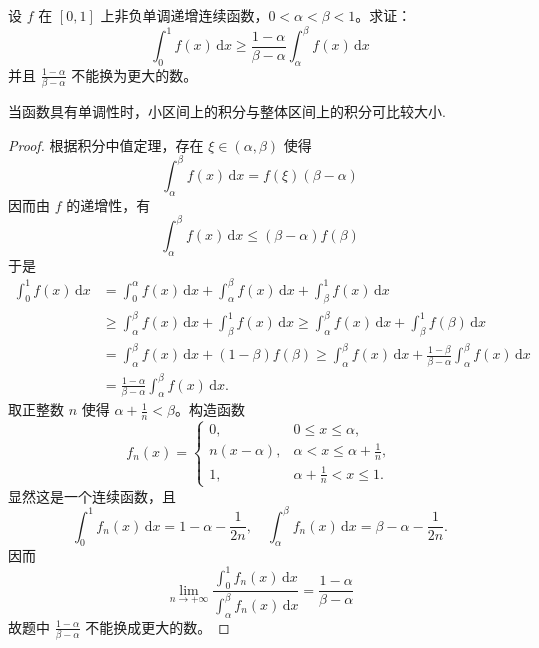 \documentclass[../../main.tex]{subfiles}
\begin{document}
\begin{example}
设 \( f \) 在 \([0,1]\) 上非负单调递增连续函数，\( 0 < \alpha < \beta < 1 \)。求证：
\[
\int_{0}^{1} f(x) \, \mathrm{d}x \geqslant \frac{1 - \alpha}{\beta - \alpha} \int_{\alpha}^{\beta} f(x) \, \mathrm{d}x
\]
并且 \( \frac{1 - \alpha}{\beta - \alpha} \) 不能换为更大的数。
\end{example}
\begin{remark}
当函数具有单调性时，小区间上的积分与整体区间上的积分可比较大小.
\end{remark}
\begin{proof}
根据积分中值定理，存在 \( \xi \in (\alpha, \beta) \) 使得
\[
\int_{\alpha}^{\beta} f(x) \, \mathrm{d}x = f(\xi)(\beta - \alpha)
\]
因而由 \( f \) 的递增性，有
\[
\int_{\alpha}^{\beta} f(x) \, \mathrm{d}x \leqslant (\beta - \alpha)f(\beta)
\]
于是
\begin{align*}
\int_{0}^{1} f(x) \, \mathrm{d}x &= \int_{0}^{\alpha} f(x) \, \mathrm{d}x + \int_{\alpha}^{\beta} f(x) \, \mathrm{d}x + \int_{\beta}^{1} f(x) \, \mathrm{d}x \\
&\geqslant \int_{\alpha}^{\beta} f(x) \, \mathrm{d}x + \int_{\beta}^{1} f(x) \, \mathrm{d}x \geqslant \int_{\alpha}^{\beta} f(x) \, \mathrm{d}x + \int_{\beta}^{1} f(\beta) \, \mathrm{d}x \\
&= \int_{\alpha}^{\beta} f(x) \, \mathrm{d}x + (1 - \beta)f(\beta) \geqslant \int_{\alpha}^{\beta} f(x) \, \mathrm{d}x + \frac{1 - \beta}{\beta - \alpha} \int_{\alpha}^{\beta} f(x) \, \mathrm{d}x \\
&= \frac{1 - \alpha}{\beta - \alpha} \int_{\alpha}^{\beta} f(x) \, \mathrm{d}x.
\end{align*}
取正整数 \( n \) 使得 \( \alpha + \frac{1}{n} < \beta \)。构造函数
\[
f_n(x) = \begin{cases} 
0, & 0 \leqslant x \leqslant \alpha, \\
n(x - \alpha), & \alpha < x \leqslant \alpha + \frac{1}{n}, \\
1, & \alpha + \frac{1}{n} < x \leqslant 1 .
\end{cases}
\]
显然这是一个连续函数，且
\[
\int_{0}^{1} f_n(x) \, \mathrm{d}x = 1 - \alpha - \frac{1}{2n}, \quad \int_{\alpha}^{\beta} f_n(x) \, \mathrm{d}x = \beta - \alpha - \frac{1}{2n}.
\]
因而
\[
\lim_{n \to +\infty} \frac{\int_{0}^{1} f_n(x) \, \mathrm{d}x}{\int_{\alpha}^{\beta} f_n(x) \, \mathrm{d}x} = \frac{1 - \alpha}{\beta - \alpha}
\]
故题中 \( \frac{1 - \alpha}{\beta - \alpha} \) 不能换成更大的数。

\end{proof}
\end{document}

